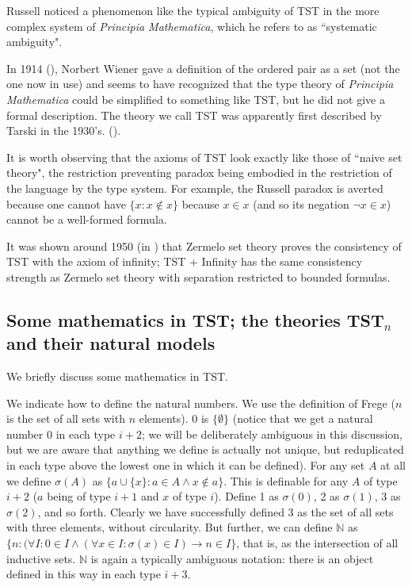\documentclass[112pt]{article}
\begin{document}
Russell noticed a phenomenon like the typical ambiguity of TST in the more complex system of {\em Principia Mathematica\/}, which he refers to as ``systematic ambiguity".

In 1914 (\cite{wiener}), Norbert Wiener gave a definition of the ordered pair as a set (not the one now in use) and seems to have recognized that the type theory of {\em Principia Mathematica\/} could be simplified to something like TST, but he did not give a formal description.  The theory we call TST was apparently first described by Tarski in the 1930's.  (\cite{tarskiontst}).

It is worth observing that the axioms of TST look exactly like those of ``naive set theory", the restriction preventing paradox being embodied in the restriction of the language by the type system.
For example, the Russell paradox is averted because one cannot have $\{x:x \not\in x\}$ because $x \in x$ (and so its negation $\neg x \in x$) cannot be a well-formed formula.

It was shown around 1950 (in \cite{kemeny}) that Zermelo set theory proves the consistency of TST with the axiom of infinity;  TST + Infinity has the same consistency strength as
Zermelo set theory with separation restricted to bounded formulas.


\newpage

\subsection{Some mathematics in TST;  the theories TST$_n$ and their natural models}

We briefly discuss some mathematics in TST.

We indicate how to define the natural numbers.  We use the definition of Frege ($n$ is the set of all sets with $n$ elements).  0 is $\{\emptyset\}$ (notice that we get a natural number 0 in each type $i+2$;  we will be deliberately ambiguous in this discussion, but we are aware that anything we define is actually not unique, but reduplicated in each type above the lowest one in which it can be defined).  For any set $A$ at all we define $\sigma(A)$ as $\{a \cup \{x\}:a \in A \wedge x \not\in a\}$.  This is definable for any $A$ of type $i+2$ ($a$ being of type $i+1$ and $x$ of type $i$).  Define 1 as $\sigma(0)$, 2 as $\sigma(1)$,  3 as $\sigma(2)$, and so forth.  Clearly we have successfully defined 3 as the set of all sets with three elements, without circularity.
But further, we can define $\mathbb N$ as $\{n:(\forall I:0 \in I \wedge (\forall x \in I:\sigma(x) \in I) \rightarrow n \in I\}$, that is, as the intersection of all inductive sets.
$\mathbb N$ is again a typically ambiguous notation:  there is an object defined in this way in each type $i+3$.
\end{document}
